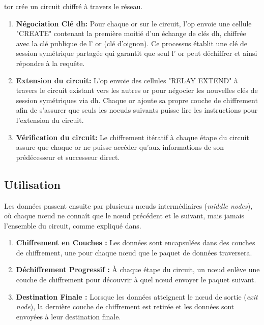 \acrshort{tor} crée un circuit chiffré à travers le réseau. 
\begin{enumerate}
  \item \textbf{Négociation Clé \acrlong{dh}:} Pour chaque  \acrshort{or}  sur le circuit, l'\acrshort{op} envoie une cellule "CREATE" contenant la première moitié d'un échange de clés \acrshort{dh}, chiffrée avec la clé publique de l' \acrshort{or}  (clé d'oignon). 
  Ce processus établit une clé de session symétrique partagée qui garantit que seul l' \acrshort{or}  peut déchiffrer et ainsi répondre à la requête.
  \item  \textbf{Extension du circuit:} L'\acrshort{op} envoie des cellules "RELAY EXTEND" à travers le circuit existant vers les autres  \acrshort{or}  pour négocier les nouvelles clés de session symétriques via \acrshort{dh}.
  Chaque  \acrshort{or}  ajoute sa propre couche de chiffrement afin de s'assurer que seuls les noeuds suivants puisse lire les instructions pour l'extension du circuit.
  \item \textbf{Vérification du circuit:} Le chiffrement itératif à chaque étape du circuit assure que chaque  \acrshort{or}  ne puisse accéder qu'aux informations de son prédécesseur et successeur direct.
\end{enumerate}

\subsection{Utilisation}\label{subsec:utilisation}

Les données passent ensuite par plusieurs nœuds intermédiaires (\textit{middle nodes}), où chaque nœud ne connaît que le nœud précédent et le suivant, mais jamais l'ensemble du circuit, comme expliqué dans.
\begin{enumerate}
  \item \textbf{Chiffrement en Couches :} Les données sont encapsulées dans des couches de chiffrement, une pour chaque nœud que le paquet de données traversera.
  \item \textbf{Déchiffrement Progressif :} À chaque étape du circuit, un nœud enlève une couche de chiffrement pour découvrir à quel nœud envoyer le paquet suivant.
  \item \textbf{Destination Finale :} 
  Lorsque les données atteignent le nœud de sortie (\textit{exit node}), la dernière couche de chiffrement est retirée et les données sont envoyées à leur destination finale.
\end{enumerate}

